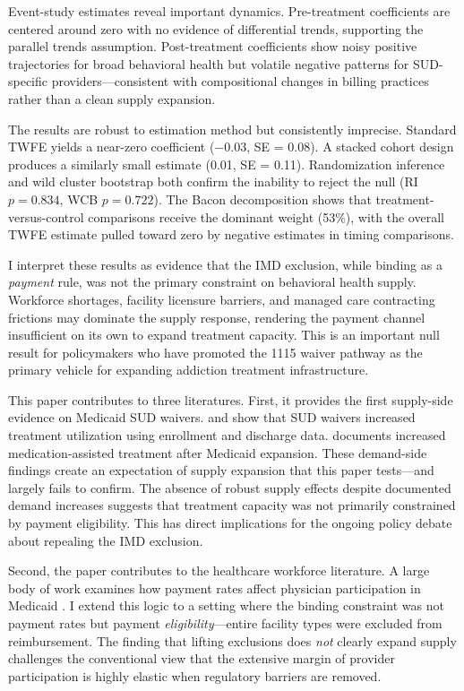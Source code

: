 \documentclass[12pt]{article}
\begin{document}
Event-study estimates reveal important dynamics. Pre-treatment coefficients are centered around zero with no evidence of differential trends, supporting the parallel trends assumption. Post-treatment coefficients show noisy positive trajectories for broad behavioral health but volatile negative patterns for SUD-specific providers---consistent with compositional changes in billing practices rather than a clean supply expansion.

The results are robust to estimation method but consistently imprecise. Standard TWFE yields a near-zero coefficient ($-0.03$, SE = 0.08). A stacked cohort design produces a similarly small estimate (0.01, SE = 0.11). Randomization inference and wild cluster bootstrap both confirm the inability to reject the null (RI $p = 0.834$, WCB $p = 0.722$). The Bacon decomposition shows that treatment-versus-control comparisons receive the dominant weight (53\%), with the overall TWFE estimate pulled toward zero by negative estimates in timing comparisons.

I interpret these results as evidence that the IMD exclusion, while binding as a \textit{payment} rule, was not the primary constraint on behavioral health supply. Workforce shortages, facility licensure barriers, and managed care contracting frictions may dominate the supply response, rendering the payment channel insufficient on its own to expand treatment capacity. This is an important null result for policymakers who have promoted the 1115 waiver pathway as the primary vehicle for expanding addiction treatment infrastructure.

This paper contributes to three literatures. First, it provides the first supply-side evidence on Medicaid SUD waivers. \citet{maclean2020effects} and \citet{wen2022medicaid} show that SUD waivers increased treatment utilization using enrollment and discharge data. \citet{saloner2019medicaid} documents increased medication-assisted treatment after Medicaid expansion. These demand-side findings create an expectation of supply expansion that this paper tests---and largely fails to confirm. The absence of robust supply effects despite documented demand increases suggests that treatment capacity was not primarily constrained by payment eligibility. This has direct implications for the ongoing policy debate about repealing the IMD exclusion.

Second, the paper contributes to the healthcare workforce literature. A large body of work examines how payment rates affect physician participation in Medicaid \citep{decker2012no, alexander2020physician, candon2021supply}. I extend this logic to a setting where the binding constraint was not payment rates but payment \textit{eligibility}---entire facility types were excluded from reimbursement. The finding that lifting exclusions does \textit{not} clearly expand supply challenges the conventional view that the extensive margin of provider participation is highly elastic when regulatory barriers are removed.
\end{document}
